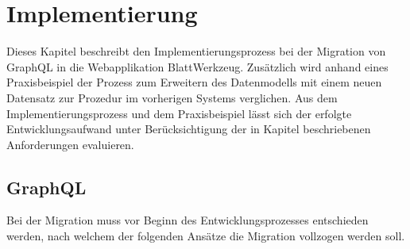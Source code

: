 

\chapter{Implementierung}
Dieses Kapitel beschreibt den Implementierungsprozess bei der Migration von GraphQL in die Webapplikation BlattWerkzeug. Zusätzlich wird anhand eines Praxisbeispiel der Prozess zum Erweitern des Datenmodells mit einem neuen Datensatz zur Prozedur im vorherigen Systems verglichen. Aus dem Implementierungsprozess und dem Praxisbeispiel lässt sich der erfolgte Entwicklungsaufwand unter Berücksichtigung der in Kapitel  beschriebenen Anforderungen evaluieren.

\section{GraphQL}
Bei der Migration muss vor Beginn des Entwicklungsprozesses entschieden werden, nach welchem der folgenden Ansätze die Migration vollzogen werden soll.


